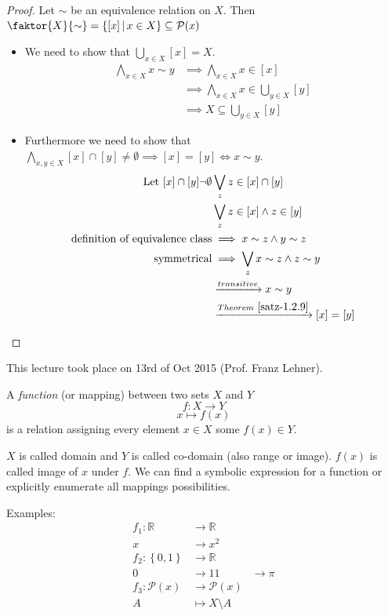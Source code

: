\documentclass[a4paper,landscape,twocolumn]{article}
\newcommand\meta[3]{This #1 took place on #2 (#3).\par}
\newcommand\set[1]{\left\{#1\right\}}
\newcommand\setdef[2]{\left\{#1\,\middle|\,#2\right\}}
\begin{document}
\begin{proof}
  Let $\sim$ be an equivalence relation on $X$.
  Then $\faktor{X}{\sim} = \setdef{[x]}{x \in X} \subseteq \mathcal{P}(x)$

  \begin{itemize}
    \item We need to show that $\bigcup_{x \in X} [x] = X$.
      \begin{align*}
        \bigwedge_{x \in X} x \sim y &\implies \bigwedge_{x \in X} x \in [x] \\
                                   &\implies \bigwedge_{x \in X} x \in \bigcup_{y \in X} [y] \\
                                   &\implies X \subseteq \bigcup_{y \in X} [y]
      \end{align*}
    \item Furthermore we need to show that
          $\bigwedge_{x,y \in X} [x] \cap [y] \neq \emptyset \implies [x] = [y] \iff x \sim y$.
      \begin{align*}
          \text{Let } [x] \cap [y] \neg \emptyset & \bigvee_z z \in [x] \cap [y] \\
              & \bigvee_z z \in [x] \land z \in [y] \\
          \text{definition of equivalence class} & \implies x \sim z \land y \sim z \\
          \text{symmetrical} & \implies \bigvee_z x \sim z \land z \sim y \\
          & \xrightarrow{transitive} x \sim y \\
          & \xrightarrow{Theorem~\ref{satz-1.2.9}} [x] = [y]
      \end{align*}
  \end{itemize}
\end{proof}

\meta{lecture}{13rd of Oct 2015}{Prof. Franz Lehner}

A \emph{function} (or mapping) between two sets $X$ and $Y$
\[ f: X \rightarrow Y \]
\[ x \mapsto f(x) \]
is a relation assigning every element $x \in X$ some $f(x) \in Y$.

$X$ is called domain and $Y$ is called co-domain (also range or image).
$f(x)$ is called image of $x$ under $f$.
We can find a symbolic expression for a function or explicitly enumerate all mappings possibilities.

Examples:
\begin{align*}
  f_1: \mathbb{R} &\rightarrow \mathbb{R} \\
                x &\rightarrow x^2 \\
  f_2: \set{0,1}  &\rightarrow \mathbb{R} \\
                0 &\rightarrow 1
                1 &\rightarrow \pi \\
  f_3: \mathcal{P}(x) &\rightarrow \mathcal{P}(x) \\
                A &\mapsto X \setminus A
\end{align*}
\end{document}
